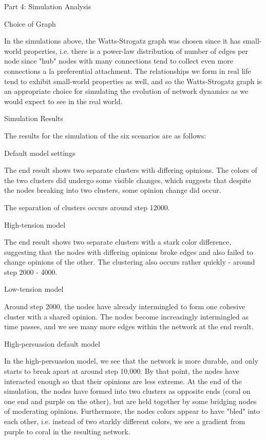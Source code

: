 \documentclass[11pt]{article}
\begin{document}
    Part 4: Simulation Analysis

Choice of Graph

In the simulations above, the Watts-Strogatz graph was chosen since it
has small-world properties, i.e. there is a power-law distribution of
number of edges per node since "hub" nodes with many connections tend to
collect even more connections a la preferential attachment. The
relationships we form in real life tend to exhibit small-world
properties as well, and so the Watts-Strogatz graph is an appropriate
choice for simulating the evolution of network dynamics as we would
expect to see in the real world.

Simulation Results

The results for the simulation of the six scenarios are as follows:

Default model settings

The end result shows two separate clusters with differing opinions. The
colors of the two clusters did undergo some visible changes, which
suggests that despite the nodes breaking into two clusters, some opinion
change did occur.

The separation of clusters occurs around step 12000.

High-tension model

The end result shows two separate clusters with a stark color
difference, suggesting that the nodes with differing opinions broke
edges and also failed to change opinions of the other. The clustering
also occurs rather quickly - around step 2000 - 4000.

Low-tension model

Around step 2000, the nodes have already intermingled to form one
cohesive cluster with a shared opinion. The nodes become increasingly
intermingled as time passes, and we see many more edges within the
network at the end result.

High-persuasion default model

In the high-persuasion model, we see that the network is more durable,
and only starts to break apart at around step 10,000. By that point, the
nodes have interacted enough so that their opinions are less extreme. At
the end of the simulation, the nodes have formed into two clusters as
opposite ends (coral on one end and purple on the other), but are held
together by some bridging nodes of moderating opinions. Furthermore, the
nodes colors appear to have "bled" into each other, i.e. instead of two
starkly different colors, we see a gradient from purple to coral in the
resulting network.
\end{document}
